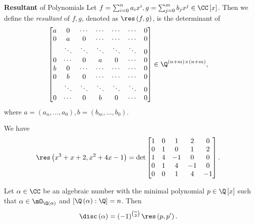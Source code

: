 \documentclass[pmath441]{subfiles}
\begin{document}
    \begin{definition}{\textbf{Resultant} of Polynomials}
        Let $f=\sum^{n}_{i=0}a_ix^i, g=\sum^{m}_{j=0}b_jx^j\in\CC\left[ x \right]$. Then we define the \emph{resultant} of $f,g$, denoted as $\res\left( f,g \right)$, is the determinant of
        \begin{equation*}
            \begin{bmatrix} 
                a & 0 & \cdots & \cdots & \cdots & \cdots & 0\\
                0 & a & 0 & \cdots & \cdots & \cdots & 0 \\
                  & \ddots & \ddots & \ddots & \ddots & \ddots & 0 \\
                0 & \cdots & 0 & a & 0 & \cdots & 0 \\
                b & 0 & \cdots & \cdots & \cdots & \cdots & 0  \\
                0 & b & 0 & \cdots & \cdots & \cdots & 0 \\
                  & \ddots & \ddots & \ddots & \ddots & \ddots & 0 \\
                0 & \cdots & 0 & b & 0 & \cdots & 0 \\
            \end{bmatrix} \in\Q^{\left( n+m \right)\times\left( n+m \right)} ,
        \end{equation*}
        where $a = \left( a_n,\ldots,a_0 \right), b = \left( b_m,\ldots,b_0 \right)$.
    \end{definition}

    \begin{example}{}
        We have
        \begin{equation*}
            \res\left( x^3+x+2,x^{2}+4x-1 \right) =
            \det
            \begin{bmatrix}
            	1 & 0 & 1 & 2 & 0 \\
            	0 & 1 & 0 & 1 & 2 \\
            	1 & 4 & -1 & 0 & 0 \\
            	0 & 1 & 4 & -1 & 0 \\
            	0 & 0 & 1 & 4 & -1 \\
            \end{bmatrix}.
        \end{equation*}
    \end{example}

    \rruleline
    
    \begin{fact}{}
        Let $\alpha\in\CC$ be an algebraic number with the minimal polynomial $p\in\Q\left[ x \right]$ such that $\alpha\in\mO_{\Q\left( \alpha \right)}$ and $\left[ \Q\left( \alpha \right):\Q \right]=n$. Then
        \begin{equation*}
            \disc\left( \alpha \right) = \left( -1 \right)^{\binom{n}{2}}\res\left( p,p' \right).
        \end{equation*}
    \end{fact}
\end{document}
